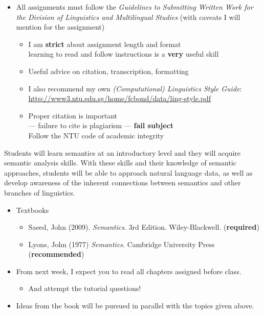 \documentclass[headrule,footrule]{foils}
\begin{document}

\begin{itemize}
\item All assignments must follow the \textit{Guidelines to Submitting
    Written Work for the Division of Linguistics and Multilingual
    Studies} (with caveats I will mention for the assignment)
  \begin{itemize}
  \item I am \textbf{strict} about assignment length and format
    \\ learning to read and follow instructions is a \textbf{very} useful skill
  \item Useful advice on citation, transcription, formatting
  \item I also recommend my own \textit{(Computational) Linguistics Style Guide}:
 \url{http://www3.ntu.edu.sg/home/fcbond/data/ling-style.pdf}
  \item Proper citation is important 
    \\ --- failure to cite is plagiarism --- \textbf{fail subject}
 \\ Follow the NTU code of academic integrity 
  \end{itemize}
\end{itemize}





Students will learn semantics at an introductory level and they will
acquire semantic analysis skills. With these skills and their
knowledge of semantic approaches, students will be able to approach
natural language data, as well as develop awareness of the inherent
connections between semantics and other branches of linguistics.



\begin{itemize}
\item Textbooks
  \begin{itemize}
  \item Saeed, John (2009). \textit{Semantics}. 3rd Edition. Wiley-Blackwell. (\textbf{required})
  \item Lyons, John (1977) \textit{Semantics}.  Cambridge University Press (\textbf{recommended})
  \end{itemize}
\item From next week, I expect you to read all chapters assigned
  before class.
  \begin{itemize}
  \item And attempt the tutorial questions!
  \end{itemize}
\item Ideas from the book will be pursued in parallel with the
  topics given above.
\end{itemize}
\end{document}
